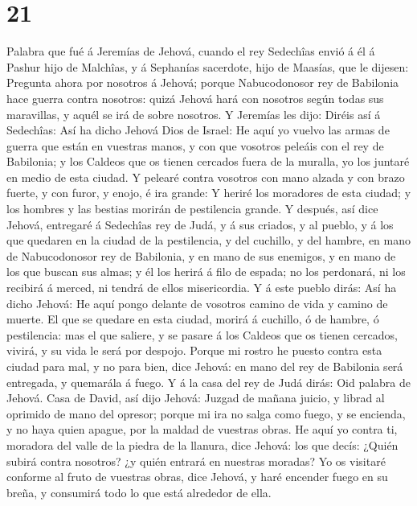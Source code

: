 \hypertarget{section-20}{%
\section{21}\label{section-20}}

 Palabra que fué á Jeremías de Jehová, cuando el rey
Sedechîas envió á él á Pashur hijo de Malchîas, y á Sephanías sacerdote,
hijo de Maasías, que le dijesen:  Pregunta ahora por
nosotros á Jehová; porque Nabucodonosor rey de Babilonia hace guerra
contra nosotros: quizá Jehová hará con nosotros según todas sus
maravillas, y aquél se irá de sobre nosotros.  Y Jeremías
les dijo: Diréis así á Sedechîas:  Así ha dicho Jehová
Dios de Israel: He aquí yo vuelvo las armas de guerra que están en
vuestras manos, y con que vosotros peleáis con el rey de Babilonia; y
los Caldeos que os tienen cercados fuera de la muralla, yo los juntaré
en medio de esta ciudad.  Y pelearé contra vosotros con
mano alzada y con brazo fuerte, y con furor, y enojo, é ira grande:
 Y heriré los moradores de esta ciudad; y los hombres y
las bestias morirán de pestilencia grande.  Y después, así
dice Jehová, entregaré á Sedechîas rey de Judá, y á sus criados, y al
pueblo, y á los que quedaren en la ciudad de la pestilencia, y del
cuchillo, y del hambre, en mano de Nabucodonosor rey de Babilonia, y en
mano de sus enemigos, y en mano de los que buscan sus almas; y él los
herirá á filo de espada; no los perdonará, ni los recibirá á merced, ni
tendrá de ellos misericordia.  Y á este pueblo dirás: Así
ha dicho Jehová: He aquí pongo delante de vosotros camino de vida y
camino de muerte.  El que se quedare en esta ciudad,
morirá á cuchillo, ó de hambre, ó pestilencia: mas el que saliere, y se
pasare á los Caldeos que os tienen cercados, vivirá, y su vida le será
por despojo.  Porque mi rostro he puesto contra esta
ciudad para mal, y no para bien, dice Jehová: en mano del rey de
Babilonia será entregada, y quemarála á fuego.  Y á la
casa del rey de Judá dirás: Oid palabra de Jehová.  Casa
de David, así dijo Jehová: Juzgad de mañana juicio, y librad al oprimido
de mano del opresor; porque mi ira no salga como fuego, y se encienda, y
no haya quien apague, por la maldad de vuestras obras. 
He aquí yo contra ti, moradora del valle de la piedra de la llanura,
dice Jehová: los que decís: ¿Quién subirá contra nosotros? ¿y quién
entrará en nuestras moradas?  Yo os visitaré conforme al
fruto de vuestras obras, dice Jehová, y haré encender fuego en su breña,
y consumirá todo lo que está alrededor de ella.

